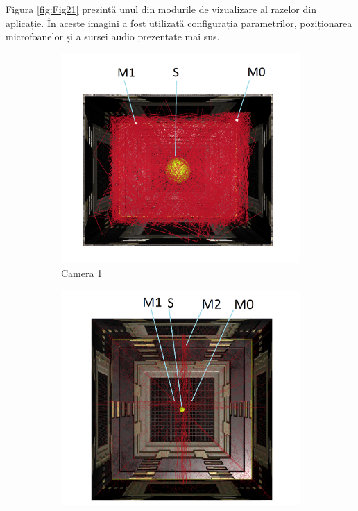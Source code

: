 	Figura \ref{fig:Fig21} prezintă unul din modurile de vizualizare al razelor din aplicație. În aceste imagini a fost utilizată configurația parametrilor, poziționarea microfoanelor și a sursei audio prezentate mai sus. 

	\begin{figure}[!htb]%
		\begin{subfigure}[b]{.3\textwidth}
			\centering
			\includegraphics[width=1\linewidth]{imagini/roomA_rays.png} 
			\caption{Camera 1}
		\end{subfigure}
		\hfill
		\begin{subfigure}[b]{.3\textwidth}
			\centering
			\includegraphics[width=1\linewidth]{imagini/roomB_rays.png}

\end{subfigure}
\end{figure}
